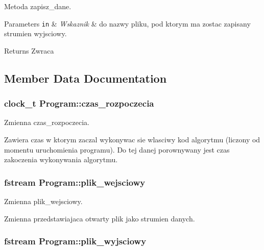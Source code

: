 Metoda zapisz\-\_\-dane. 


\begin{DoxyParams}[1]{Parameters}
\mbox{\tt in}  & {\em Wskaznik} & do nazwy pliku, pod ktorym ma zostac zapisany strumien wyjsciowy. \\
\hline
\end{DoxyParams}
\begin{DoxyReturn}{Returns}
Zwraca 
\end{DoxyReturn}


\subsection{Member Data Documentation}
\hypertarget{class_program_a8cdcc795adc329732f41b399044d0a5b}{
\subsubsection[{czas\-\_\-rozpoczecia}]{\setlength{\rightskip}{0pt plus 5cm}clock\-\_\-t Program\-::czas\-\_\-rozpoczecia}}\label{class_program_a8cdcc795adc329732f41b399044d0a5b}


Zmienna czas\-\_\-rozpoczecia. 

Zawiera czas w ktorym zaczal wykonywac sie wlasciwy kod algorytmu (liczony od momentu uruchomienia programu). Do tej danej porownywany jest czas zakoczenia wykonywania algorytmu. \hypertarget{class_program_a532ceacb1d70da66142bab96a3eb0753}{
\subsubsection[{plik\-\_\-wejsciowy}]{\setlength{\rightskip}{0pt plus 5cm}fstream Program\-::plik\-\_\-wejsciowy}}\label{class_program_a532ceacb1d70da66142bab96a3eb0753}


Zmienna plik\-\_\-wejsciowy. 

Zmienna przedstawiajaca otwarty plik jako strumien danych. \hypertarget{class_program_aaa305591a4333d799c8d353f3072d8e0}{
\subsubsection[{plik\-\_\-wyjsciowy}]{\setlength{\rightskip}{0pt plus 5cm}fstream Program\-::plik\-\_\-wyjsciowy}}\label{class_program_aaa305591a4333d799c8d353f3072d8e0}


